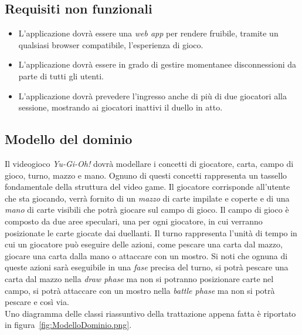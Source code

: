     \subsection{Requisiti non funzionali}\label{subsec:requisitiNonFunzionali}
        \begin{itemize}
            \item L'applicazione dovrà essere una \textit{web app} per rendere fruibile, tramite un qualsiasi browser compatibile, l'esperienza di gioco.
            \item L'applicazione dovrà essere in grado di gestire momentanee disconnessioni da parte di tutti gli utenti.
            \item L'applicazione dovrà prevedere l'ingresso anche di più di due giocatori alla sessione, mostrando ai giocatori inattivi il duello in atto.
        \end{itemize}

    \subsection{Modello del dominio}
        Il videogioco \textit{Yu-Gi-Oh!} dovrà modellare i concetti di giocatore, carta, campo di gioco, turno, mazzo e mano. Ognuno di questi concetti rappresenta un tassello fondamentale
        della struttura del video game. Il giocatore corrisponde all'utente che sta giocando, verrà fornito di un \textit{mazzo} di carte impilate e coperte e di una \textit{mano} di
        carte visibili che potrà giocare sul campo di gioco. Il campo di gioco è composto da due aree speculari, una per ogni giocatore, in cui verranno posizionate le carte giocate
        dai duellanti. Il turno rappresenta l'unità di tempo in cui un giocatore può eseguire delle azioni, come pescare una carta dal mazzo, giocare una carta dalla mano o attaccare
        con un mostro. Si noti che ognuna di queste azioni sarà eseguibile in una \textit{fase} precisa del turno, si potrà pescare una carta dal mazzo nella \textit{draw phase} ma
        non si potranno posizionare carte nel campo, si potrà attaccare con un mostro nella \textit{battle phase} ma non si potrà pescare e così via.\\
        Uno diagramma delle classi riassuntivo della trattazione appena fatta è riportato in figura~\ref{fig:ModelloDominio.png}.\\
    